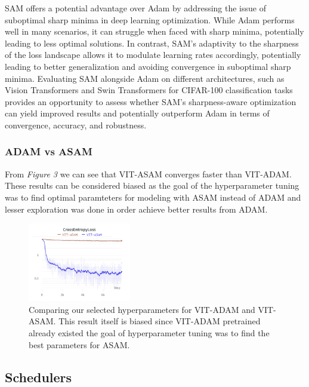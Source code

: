 \documentclass{article}
\begin{document}
SAM offers a potential advantage over Adam by addressing the issue of suboptimal sharp minima in deep learning optimization.
While Adam performs well in many scenarios, it can struggle when faced with sharp minima, potentially leading to less optimal solutions.
In contrast, SAM's adaptivity to the sharpness of the loss landscape allows it to modulate learning rates accordingly, potentially leading to better generalization and avoiding convergence in suboptimal sharp minima.
Evaluating SAM alongside Adam on different architectures, such as Vision Transformers and Swin Transformers for CIFAR-100 classification tasks provides an opportunity to assess whether SAM's sharpness-aware optimization can yield improved results and potentially outperform Adam in terms of convergence, accuracy, and robustness.

\subsubsection{ADAM vs ASAM}
From \textit{Figure 3} we can see that VIT-ASAM converges faster than VIT-ADAM.
These results can be considered biased as the goal of the hyperparameter tuning was to find optimal paramteters for modeling with ASAM instead of ADAM and lesser exploration was done in order achieve better results from ADAM.


\begin{figure}[ht]
    \vskip 0.2in
    \centering
    \includegraphics[width=0.4\textwidth]{optimizers.png}
    \caption{Comparing our selected hyperparameters for VIT-ADAM and VIT-ASAM. This result itself is biased since VIT-ADAM pretrained already existed the goal of hyperparameter tuning was to find the best parameters for ASAM.}
    \label{fig:foobar}
    \vskip -0.2in
\end{figure}

\subsection{Schedulers}
\end{document}
